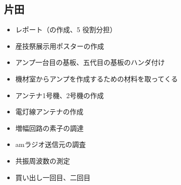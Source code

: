 \documentclass[report.tex]{subfiles}
\begin{document}
\subsection{片田}

\begin{itemize}
	\item レポート（の作成、5 役割分担）
	\item 産技祭展示用ポスターの作成
	\item アンプ一台目の基板、五代目の基板のハンダ付け
	\item 機材室からアンプを作成するための材料を取ってくる
	\item アンテナ1号機、2号機の作成
	\item 電灯線アンテナの作成
	\item 増幅回路の素子の調達
	\item amラジオ送信元の調査
	\item 共振周波数の測定
	\item 買い出し一回目、二回目
\end{itemize}
\end{document}
